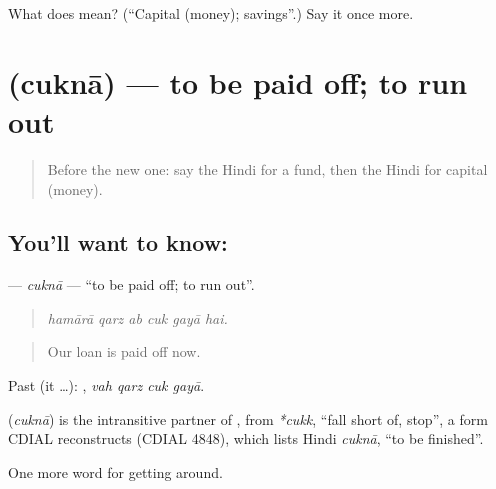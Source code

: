 \begin{tcolorbox}[breakable,colback=teal!4,colframe=teal!35!black,title={Before you move on}]
What does  mean? (\textquotedblleft{}Capital (money); savings\textquotedblright{}.) Say it once more.
\end{tcolorbox}
\section[\texorpdfstring{\hi{चुकना} (cuknā)}{चुकना (cuknā)}]{ (cuknā) — to be paid off; to run out}

\label{lesson:HI-C430-cuknaintr}



\begin{quote}
Before the new one: say the Hindi for a fund, then the Hindi for capital (money).
\end{quote}

\subsection*{You'll want to know: }
\textbf{} — \emph{cuknā} — \textquotedblleft{}to be paid off; to run out\textquotedblright{}.

\begin{quote}
     
\end{quote}

\begin{quote}
\emph{hamārā qarz ab cuk gayā hai.}
\end{quote}

\begin{quote}
Our loan is paid off now.
\end{quote}

Past (it …):    , \emph{vah qarz cuk gayā}.

\begin{cousinweb}
\textbf{} (\emph{cuknā}) is the intransitive partner of , from \emph{*cukk}, \textquotedblleft{}fall short of, stop\textquotedblright{}, a form CDIAL reconstructs (CDIAL 4848), which lists Hindi \emph{cuknā}, \textquotedblleft{}to be finished\textquotedblright{}.
\end{cousinweb}

\begin{grammarlens}[title={What you've built}]
One more word for getting around.
\end{grammarlens}

